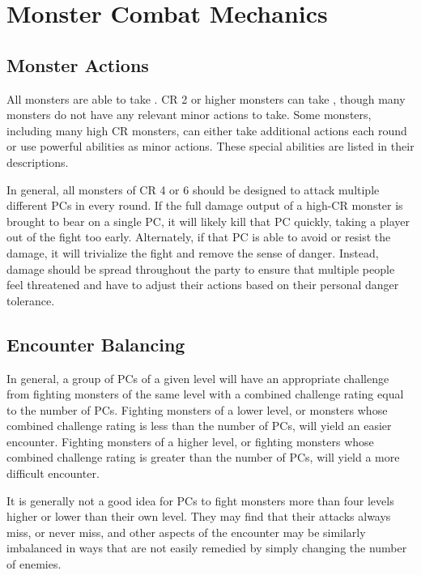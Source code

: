 \section{Monster Combat Mechanics}

    \subsection{Monster Actions}
        All monsters are able to take .
        CR 2 or higher monsters can take , though many monsters do not have any relevant minor actions to take.
        Some monsters, including many high CR monsters, can either take additional actions each round or use powerful abilities as minor actions.
        These special abilities are listed in their descriptions.

        In general, all monsters of CR 4 or 6 should be designed to attack multiple different PCs in every round.
        If the full damage output of a high-CR monster is brought to bear on a single PC, it will likely kill that PC quickly, taking a player out of the fight too early.
        Alternately, if that PC is able to avoid or resist the damage, it will trivialize the fight and remove the sense of danger.
        Instead, damage should be spread throughout the party to ensure that multiple people feel threatened and have to adjust their actions based on their personal danger tolerance.

    \subsection{Encounter Balancing}\label{Encounter Balancing}
        In general, a group of PCs of a given level will have an appropriate challenge from fighting monsters of the same level with a combined challenge rating equal to the number of PCs.
        Fighting monsters of a lower level, or monsters whose combined challenge rating is less than the number of PCs, will yield an easier encounter.
        Fighting monsters of a higher level, or fighting monsters whose combined challenge rating is greater than the number of PCs, will yield a more difficult encounter.

        It is generally not a good idea for PCs to fight monsters more than four levels higher or lower than their own level.
        They may find that their attacks always miss, or never miss, and other aspects of the encounter may be similarly imbalanced in ways that are not easily remedied by simply changing the number of enemies.

